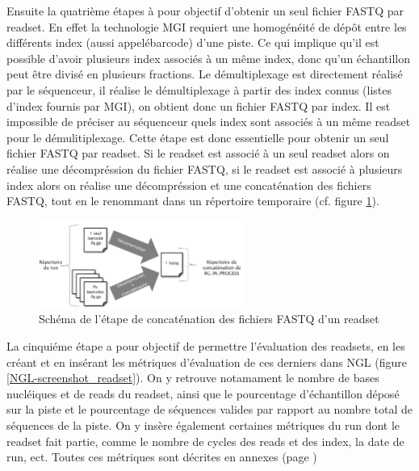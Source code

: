 Ensuite la quatrième étapes à pour objectif d'obtenir un seul fichier FASTQ par readset.
En effet la technologie MGI requiert une homogénéité de dépôt entre les différents index (aussi appelé\og barcode\fg{}) d'une piste.
Ce qui implique qu'il est possible d'avoir plusieurs index associés à un même index, donc qu'un échantillon peut être divisé en plusieurs fractions.
Le démultiplexage est directement réalisé par le séquenceur, il réalise le démultiplexage à partir des index connus (listes d'index fournis par MGI), on obtient donc un fichier FASTQ par index. Il est impossible de préciser au séquenceur quels index sont associés à un même readset pour le démulitiplexage.
Cette étape est donc essentielle pour obtenir un seul fichier FASTQ par readset.
Si le readset est associé à un seul readset alors on réalise une décompréssion du fichier FASTQ, si le readset est associé à plusieurs index alors on réalise une décompréssion et une concaténation des fichiers FASTQ, tout en le renommant dans un répertoire temporaire (cf. figure \ref{schema-concat-fastq}).

\begin{figure}[H]
    \centering
    \includegraphics[width=0.6\textwidth]{img/Schéma_concaténation.png}
    \caption{\footnotesize{Schéma de l'étape de \og concaténation\fg{} des fichiers FASTQ d'un readset}}
    \label{schema-concat-fastq}
\end{figure}

La cinquiéme étape a pour objectif de permettre l'évaluation des readsets, en les créant et en insérant les métriques d'évaluation de ces derniers dans NGL (figure \ref{NGL-screenshot_readset}).
On y retrouve notamament le nombre de bases nucléiques et de reads du readset, ainsi que le pourcentage d'échantillon déposé sur la piste et le pourcentage de séquences valides par rapport au nombre total de séquences de la piste.
On y insère également certaines métriques du run dont le readset fait partie, comme le nombre de cycles des reads et des index, la date de run, ect. Toutes ces métriques sont décrites en annexes (page \pageref{anexes3})

